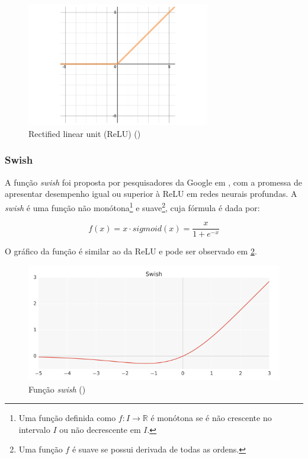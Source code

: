 \begin{figure}[H] 
  \includegraphics[width= 8cm]{../figuras/relu.png}
  \caption{Rectified linear unit (ReLU) (\cite{dl-oreilly})}
  \label{fig:relu}
\end{figure}

\subsubsection{Swish}

A função \textit{swish} foi proposta por pesquisadores da 
Google em \cite{swish}, com a promessa de apresentar desempenho igual 
ou superior à ReLU em redes neurais profundas. A \textit{swish} é uma função 
não monótona\footnote{Uma função definida como $f: I \rightarrow \mathbb{R}$
é monótona se é não crescente no intervalo $I$ ou não decrescente em $I$.} e 
suave\footnote{Uma função $f$ é suave se possui derivada de todas as ordens.},
cuja fórmula é dada por:

\begin{equation}
  f(x) = x \cdot sigmoid(x) = \frac{x}{1+e^{-x}}
\end{equation}


O gráfico da função é similar ao da ReLU e pode ser observado em \ref{fig:swish}.

\begin{figure}[H] 
  \includegraphics[width= 12cm]{../figuras/swish.png}
  \caption{Função \textit{swish} (\cite{swish})}
  \label{fig:swish}
\end{figure}


